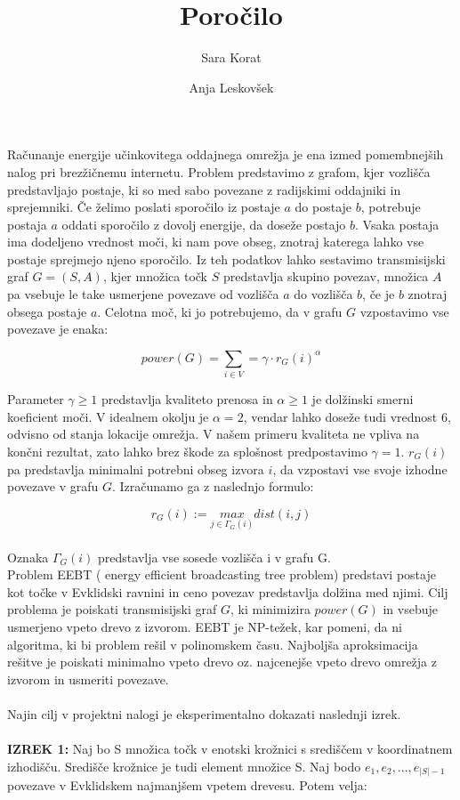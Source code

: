 \documentclass[a4paper]{report}
\author{Sara Korat \and Anja Leskovšek}
\title{\textbf{\Huge{Poročilo}}}
\begin{document}
\maketitle 
\pagebreak

Računanje energije učinkovitega oddajnega omrežja je ena izmed pomembnejših nalog pri brezžičnemu internetu. Problem predstavimo z grafom, kjer vozlišča predstavljajo postaje, ki so med sabo povezane z radijskimi oddajniki in sprejemniki. Če želimo poslati sporočilo iz postaje $a$ do postaje $b$, potrebuje postaja $a$ oddati sporočilo z dovolj energije, da doseže postajo $b$. Vsaka postaja ima dodeljeno vrednost moči, ki nam pove obseg, znotraj katerega lahko vse postaje sprejmejo njeno sporočilo. Iz teh podatkov lahko sestavimo transmisijski graf $ G = (S, A)$, kjer množica točk $S$ predstavlja skupino povezav, množica $A$ pa vsebuje le take usmerjene povezave od vozlišča $a$ do vozlišča $b$, če je $b$ znotraj obsega postaje $a$. Celotna moč, ki jo potrebujemo, da v grafu $G$ vzpostavimo vse povezave je enaka: 

$$ power(G) = \sum_{i\in V} = \gamma \cdot r_G(i)^{\alpha} $$

Parameter $ \gamma \geq 1 $ predstavlja kvaliteto prenosa in $ \alpha \geq 1 $ je dolžinski smerni koeficient moči. V idealnem okolju je $ \alpha = 2 $, vendar lahko doseže tudi vrednost 6, odvisno od stanja lokacije omrežja. V našem primeru kvaliteta ne vpliva na končni rezultat, zato lahko brez škode za splošnost predpostavimo $\gamma=1$. $r_G(i)$ pa predstavlja minimalni potrebni obseg izvora $i$, da vzpostavi vse svoje izhodne povezave v grafu $G$. Izračunamo ga z naslednjo formulo:

$$r_G(i) := \underset{j \in \Gamma_G(i)}{max} dist(i,j) $$
\\
Oznaka $ \Gamma_G(i) $ predstavlja vse sosede vozlišča i v grafu G.
\\

Problem EEBT ( energy efficient broadcasting tree problem) predstavi postaje kot točke v Evklidski ravnini in ceno povezav predstavlja dolžina med njimi. Cilj problema je poiskati transmisijski graf $G$, ki minimizira $power(G)$ in vsebuje usmerjeno vpeto drevo z izvorom. EEBT je NP-težek, kar pomeni, da ni algoritma, ki bi problem rešil v polinomskem času. Najboljša aproksimacija rešitve je poiskati minimalno vpeto drevo oz. najcenejše vpeto drevo omrežja z izvorom in usmeriti povezave.
\\
\\
Najin cilj v projektni nalogi je eksperimentalno dokazati naslednji izrek.\\
\\
\textbf{IZREK 1:} Naj bo S množica točk v enotski krožnici s središčem v koordinatnem izhodišču. Središče krožnice je tudi element množice S. Naj bodo $e_1, e_2, \ldots, e_{|S|-1}$ povezave v Evklidskem najmanjšem vpetem drevesu. Potem velja: 
\end{document}
